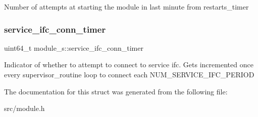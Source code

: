 Number of attempts at starting the module in last minute from restarts\+\_\+timer \mbox{\label{structmodule__s_a2f7cfab9ce8cf52aebaa7a752f019001}} 
\subsubsection{\texorpdfstring{service\+\_\+ifc\+\_\+conn\+\_\+timer}{service\_ifc\_conn\_timer}}
{\footnotesize\ttfamily uint64\+\_\+t module\+\_\+s\+::service\+\_\+ifc\+\_\+conn\+\_\+timer}

Indicator of whether to attempt to connect to service ifc. Gets incremented once every supervisor\+\_\+routine loop to connect each N\+U\+M\+\_\+\+S\+E\+R\+V\+I\+C\+E\+\_\+\+I\+F\+C\+\_\+\+P\+E\+R\+I\+OD 

The documentation for this struct was generated from the following file\+:\begin{DoxyCompactItemize}
\item 
src/module.\+h\end{DoxyCompactItemize}
